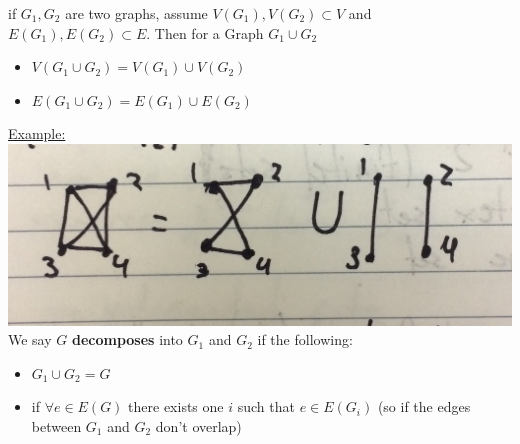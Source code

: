 \documentclass[12pt]{article}
\begin{document}
\begin{tcolorbox}[title=Definition: Union of Graphs]
	if $G_1, G_2$ are two graphs, assume $V(G_1), V(G_2) \subset V$ and $E(G_1), E(G_2) \subset E$. Then for a Graph $G_1 \cup G_2$
	\begin{itemize}
		\item{$V(G_1 \cup G_2) = V(G_1) \cup V(G_2)$}
		\item{$E(G_1 \cup G_2) = E(G_1) \cup E(G_2)$}
	\end{itemize}
\end{tcolorbox}

\underline{Example:}\\
\includegraphics[scale=0.2]{lec3-2}\\

We say $G$ \textbf{decomposes} into $G_1$ and $G_2$ if the following:
\begin{itemize}
	\item{$G_1 \cup G_2 = G$}
	\item{if $\forall e \in E(G)$ there exists one $i$ such that $e\in E(G_i)$ (so if the edges between $G_1$ and $G_2$ don't overlap)}
\end{itemize}
\end{document}
